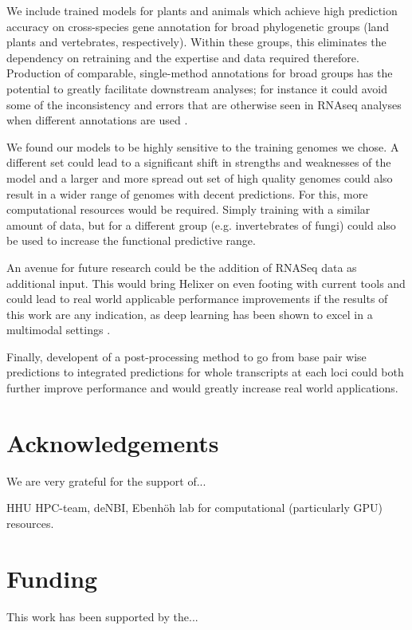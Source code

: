 \documentclass{bioinfo}
\begin{document}
We include trained models for plants and animals which achieve 
high prediction accuracy on cross-species gene annotation for broad 
phylogenetic groups (land plants and vertebrates, respectively).
Within these groups, this eliminates the dependency on retraining and the
expertise and data required therefore. Production of comparable, single-method
annotations for broad groups has the potential to greatly facilitate downstream
analyses; for instance it could avoid some of the inconsistency and errors that
are otherwise seen in RNAseq analyses when different annotations are used 
\citep{zhao2015comprehensive,torres2016robust}.

We found our models to be highly sensitive to the training genomes we chose. A 
different set could lead to a significant shift in strengths and weaknesses of the 
model and a larger and more spread out set of high quality genomes could also result 
in a wider range of genomes with decent predictions. For this, more computational 
resources would be required. Simply training with a similar amount of data, 
but for a different group (e.g. invertebrates of fungi) could also be used to 
increase the functional predictive range. 

An avenue for future research could be the addition of RNASeq data as additional 
input. This would bring Helixer on even footing with current tools and could lead 
to real world applicable performance improvements if the results of this work are 
any indication, as deep learning has been shown to excel in a multimodal settings 
\citep{ching2018opportunities}.

Finally, developent of a post-processing method
to go from base pair wise predictions to integrated predictions for whole 
transcripts at each loci could both further improve performance and would
greatly increase real world applications.

\section*{Acknowledgements}

We are very grateful for the support of...

HHU HPC-team, deNBI, Ebenh{\"o}h lab for computational (particularly GPU) resources.

\section*{Funding}

This work has been supported by the... \vspace*{-12pt}
\end{document}
